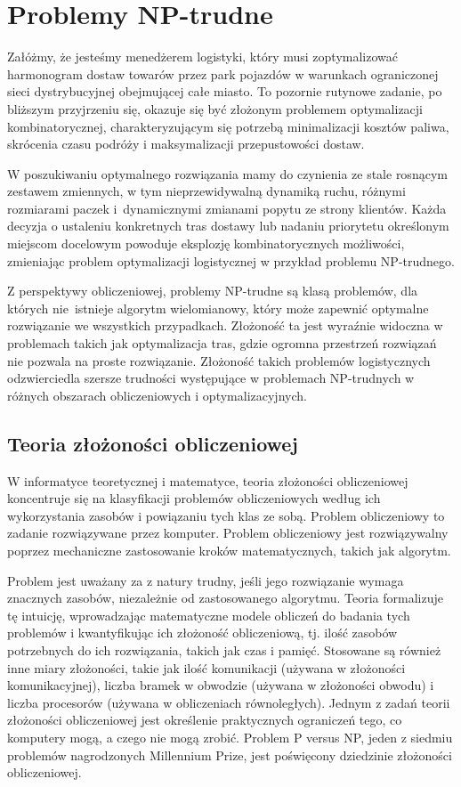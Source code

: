 \chapter{Problemy NP-trudne}

Załóżmy, że jesteśmy menedżerem logistyki, który musi zoptymalizować harmonogram dostaw towarów przez park pojazdów w warunkach ograniczonej sieci dystrybucyjnej obejmującej całe miasto. To pozornie rutynowe zadanie, po bliższym przyjrzeniu się, okazuje się być złożonym problemem optymalizacji kombinatorycznej, charakteryzującym się potrzebą minimalizacji kosztów paliwa, skrócenia czasu podróży i maksymalizacji przepustowości dostaw.

W poszukiwaniu optymalnego rozwiązania mamy do czynienia ze stale rosnącym zestawem zmiennych, w tym nieprzewidywalną dynamiką ruchu, różnymi rozmiarami paczek i~dynamicznymi zmianami popytu ze strony klientów. Każda decyzja o ustaleniu konkretnych tras dostawy lub nadaniu priorytetu określonym miejscom docelowym powoduje eksplozję kombinatorycznych możliwości, zmieniając problem optymalizacji logistycznej w przykład problemu NP-trudnego.

Z perspektywy obliczeniowej, problemy NP-trudne są klasą problemów, dla których nie~istnieje algorytm wielomianowy, który może zapewnić optymalne rozwiązanie we wszystkich przypadkach. Złożoność ta jest wyraźnie widoczna w problemach takich jak optymalizacja tras, gdzie ogromna przestrzeń rozwiązań nie pozwala na proste rozwiązanie. Złożoność takich problemów logistycznych odzwierciedla szersze trudności występujące w problemach NP-trudnych w różnych obszarach obliczeniowych i optymalizacyjnych.


\section{Teoria złożoności obliczeniowej}

W informatyce teoretycznej i matematyce, teoria złożoności obliczeniowej koncentruje się na klasyfikacji problemów obliczeniowych według ich wykorzystania zasobów i powiązaniu tych klas ze sobą. Problem obliczeniowy to zadanie rozwiązywane przez komputer. Problem obliczeniowy jest rozwiązywalny poprzez mechaniczne zastosowanie kroków matematycznych, takich jak algorytm.

Problem jest uważany za z natury trudny, jeśli jego rozwiązanie wymaga znacznych zasobów, niezależnie od zastosowanego algorytmu. Teoria formalizuje tę intuicję, wprowadzając matematyczne modele obliczeń do badania tych problemów i kwantyfikując ich złożoność obliczeniową, tj. ilość zasobów potrzebnych do ich rozwiązania, takich jak czas i pamięć. Stosowane są również inne miary złożoności, takie jak ilość komunikacji (używana w złożoności komunikacyjnej), liczba bramek w obwodzie (używana w złożoności obwodu) i liczba procesorów (używana w obliczeniach równoległych). Jednym z zadań teorii złożoności obliczeniowej jest określenie praktycznych ograniczeń tego, co komputery mogą, a czego nie mogą zrobić. Problem P versus NP, jeden z siedmiu problemów nagrodzonych Millennium Prize, jest poświęcony dziedzinie złożoności obliczeniowej.

